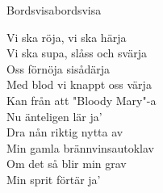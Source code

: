 \begin{song}{Bordsvisa}{bordsvisa}
\begin{vers}
Vi ska röja, vi ska härja\\
Vi ska supa, slåss och svärja\\
Oss förnöja sisådärja\\
Med blod vi knappt oss värja\\
Kan från att "Bloody Mary"-a\\
Nu änteligen lär ja'\\
Dra nån riktig nytta av  \\
Min gamla brännvinsautoklav\\
Om det så blir min grav\\
Min sprit förtär ja'\\
\end{vers}
\end{song}
